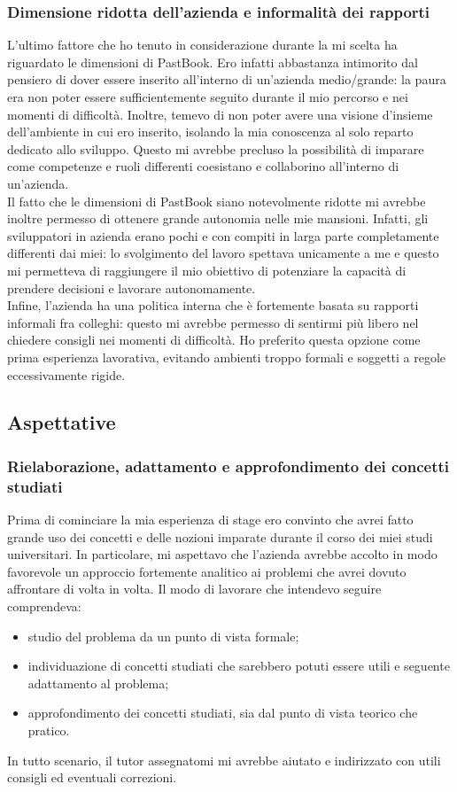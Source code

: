 			\subsubsection{Dimensione ridotta dell'azienda e informalità dei rapporti}
				L'ultimo fattore che ho tenuto in considerazione durante la mi scelta ha riguardato le dimensioni di PastBook. Ero
				infatti abbastanza intimorito dal pensiero di dover essere inserito all'interno di un'azienda medio/grande: la paura
				era non poter essere sufficientemente seguito durante il mio percorso e nei momenti di difficoltà. Inoltre,
				temevo di non poter avere una visione d'insieme dell'ambiente in cui ero inserito, isolando la mia conoscenza al
				solo reparto dedicato allo sviluppo. Questo mi avrebbe precluso la possibilità di imparare come competenze e ruoli
				differenti coesistano e collaborino all'interno di un'azienda.\\
				Il fatto che le dimensioni di PastBook siano notevolmente ridotte mi avrebbe inoltre permesso di ottenere grande
				autonomia nelle mie mansioni. Infatti, gli sviluppatori in azienda erano pochi e con compiti in larga parte
				completamente differenti dai miei: lo svolgimento del lavoro spettava unicamente a me e questo mi permetteva di
				raggiungere il mio obiettivo di potenziare la capacità di prendere decisioni e lavorare autonomamente.\\
				Infine, l'azienda ha una politica interna che è fortemente basata su rapporti informali fra colleghi: questo mi
				avrebbe permesso di sentirmi più libero nel chiedere consigli nei momenti di difficoltà. Ho preferito questa opzione
				come prima esperienza lavorativa, evitando ambienti troppo formali e soggetti a regole eccessivamente rigide.
		\subsection{Aspettative}
			\subsubsection{Rielaborazione, adattamento e approfondimento dei concetti studiati}
				Prima di cominciare la mia esperienza di stage ero convinto che avrei fatto grande uso dei concetti e delle nozioni
				imparate durante il corso dei miei studi universitari. In particolare, mi aspettavo che l'azienda avrebbe accolto
				in modo favorevole un approccio fortemente analitico ai problemi che avrei dovuto affrontare di volta in volta. Il
				modo di lavorare che intendevo seguire comprendeva:
				\begin{itemize}
					\item studio del problema da un punto di vista formale;
					\item individuazione di concetti studiati che sarebbero potuti essere utili e seguente adattamento al
					problema;
					\item approfondimento dei concetti studiati, sia dal punto di vista teorico che pratico.
				\end{itemize}
				In tutto scenario, il tutor assegnatomi mi avrebbe aiutato e indirizzato con utili consigli ed eventuali correzioni.
